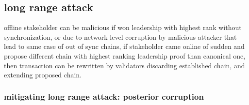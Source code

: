 \documentclass[a4paper]{article}
\begin{document}
\label{longrange}
\subsection {long range attack}
offline stakeholder can be malicious if won leadership with highest rank without synchronization, or due to network level corruption by malicious attacker that lead to same case of out of sync chains, if stakeholder came online of sudden and propose different chain with highest ranking leadership proof than canonical one, then transaction can be rewritten by validators discarding established chain, and extending proposed chain.


\subsubsection {mitigating long range attack: posterior corruption}
\end{document}
